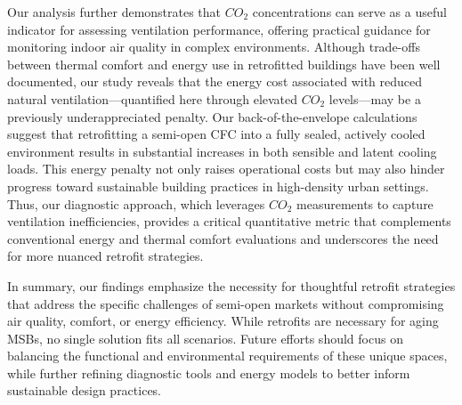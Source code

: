 \documentclass[preprint,12pt]{elsarticle}
\begin{document}
Our analysis further demonstrates that $CO_2$ concentrations can serve as a useful indicator for assessing ventilation performance, offering practical guidance for monitoring indoor air quality in complex environments. Although trade-offs between thermal comfort and energy use in retrofitted buildings have been well documented, our study reveals that the energy cost associated with reduced natural ventilation—quantified here through elevated $CO_2$ levels—may be a previously underappreciated penalty. Our back-of-the-envelope calculations suggest that retrofitting a semi-open CFC into a fully sealed, actively cooled environment results in substantial increases in both sensible and latent cooling loads. This energy penalty not only raises operational costs but may also hinder progress toward sustainable building practices in high-density urban settings. Thus, our diagnostic approach, which leverages $CO_2$ measurements to capture ventilation inefficiencies, provides a critical quantitative metric that complements conventional energy and thermal comfort evaluations and underscores the need for more nuanced retrofit strategies.

In summary, our findings emphasize the necessity for thoughtful retrofit strategies that address the specific challenges of semi-open markets without compromising air quality, comfort, or energy efficiency. While retrofits are necessary for aging MSBs, no single solution fits all scenarios. Future efforts should focus on balancing the functional and environmental requirements of these unique spaces, while further refining diagnostic tools and energy models to better inform sustainable design practices.



\clearpage
\balance

  
 
\end{document}
